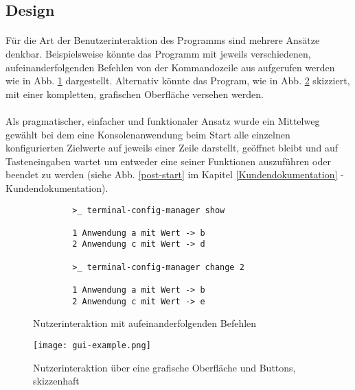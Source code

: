 \subsection{Design}
\paragraph{}
Für die Art der Benutzerinteraktion des Programms sind mehrere Ansätze denkbar.
Beispielsweise könnte das Programm mit jeweils verschiedenen, aufeinanderfolgenden
Befehlen von der Kommandozeile aus aufgerufen werden wie in Abb. \ref{simple-gui-example}
dargestellt. Alternativ könnte das Program, wie in Abb. \ref{graphical-gui-example} skizziert,
mit einer kompletten, grafischen Oberfläche versehen werden.

\paragraph{}
Als pragmatischer, einfacher und funktionaler Ansatz wurde ein Mittelweg gewählt
bei dem eine Konsolenanwendung beim Start alle einzelnen konfigurierten
Zielwerte auf jeweils einer Zeile darstellt, geöffnet bleibt und auf Tasteneingaben
wartet um entweder eine seiner Funktionen auszuführen oder beendet zu werden (siehe Abb. \ref{post-start}
im Kapitel \ref{Kundendokumentation} - Kundendokumentation).


\begin{figure}
    \caption{Nutzerinteraktion mit aufeinanderfolgenden Befehlen}
    \label{simple-gui-example}
    \begin{verbatim}
        >_ terminal-config-manager show
    
        1 Anwendung a mit Wert -> b
        2 Anwendung c mit Wert -> d
    
        >_ terminal-config-manager change 2
    
        1 Anwendung a mit Wert -> b
        2 Anwendung c mit Wert -> e
    \end{verbatim}
\end{figure}

\begin{figure}
    \caption{Nutzerinteraktion über eine grafische Oberfläche und Buttons, skizzenhaft}
    \label{graphical-gui-example}
    \centering\texttt{[image: gui-example.png]}
\end{figure}
